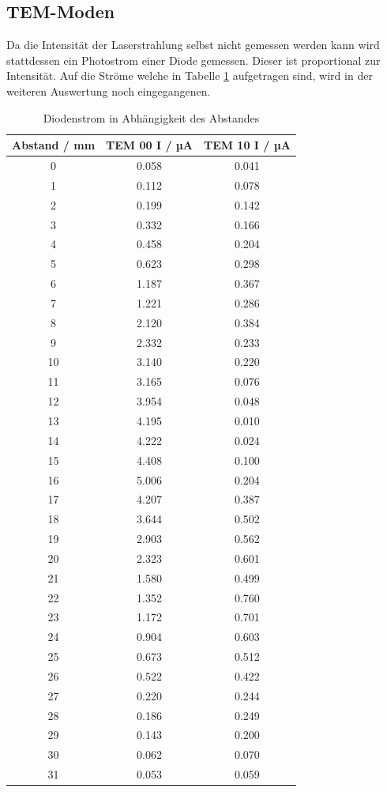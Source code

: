 \subsection{TEM-Moden}
Da die Intensität der Laserstrahlung selbst nicht gemessen werden kann wird stattdessen ein Photostrom einer Diode gemessen. Dieser ist proportional zur Intensität. Auf die Ströme welche in Tabelle \ref{tab:tem} aufgetragen sind, wird in der weiteren Auswertung noch eingegangenen.
\begin{table}
  \centering
  \begin{tabular}{c|c c}
     \toprule
     	Abstand / mm & TEM 00 I / µA & TEM 10 I / µA \\
     \midrule
     0		& 0.058		& 0.041	\\
     1		& 0.112		& 0.078	\\
     2		& 0.199		& 0.142	\\
     3		& 0.332		& 0.166	\\
     4		& 0.458		& 0.204	\\
     5		& 0.623		& 0.298	\\
     6		& 1.187		& 0.367	\\
     7		& 1.221		& 0.286	\\
     8		& 2.120		& 0.384	\\
     9		& 2.332		& 0.233	\\
     10		& 3.140		& 0.220	\\
     11		& 3.165		& 0.076	\\
     12		& 3.954		& 0.048	\\
     13		& 4.195		& 0.010	\\
     14		& 4.222		& 0.024	\\
     15		& 4.408		& 0.100	\\
     16		& 5.006		& 0.204	\\
     17		& 4.207		& 0.387	\\
     18		& 3.644		& 0.502	\\
     19		& 2.903		& 0.562	\\
     20		& 2.323		& 0.601	\\
     21		& 1.580		& 0.499	\\
     22		& 1.352		& 0.760	\\
     23		& 1.172		& 0.701	\\
     24		& 0.904		& 0.603	\\
     25		& 0.673		& 0.512	\\
     26		& 0.522		& 0.422	\\
     27		& 0.220		& 0.244	\\
     28		& 0.186		& 0.249	\\
     29		& 0.143		& 0.200	\\
     30		& 0.062		& 0.070	\\
     31		& 0.053		& 0.059	\\
     \bottomrule
  \end{tabular}
  \caption{Diodenstrom in Abhängigkeit des Abstandes}
  \label{tab:tem}
\end{table}
